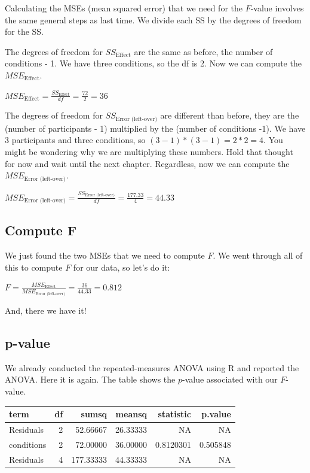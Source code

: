 \documentclass[
]{book}
\begin{document}
Calculating the MSEs (mean squared error) that we need for the \(F\)-value involves the same general steps as last time. We divide each SS by the degrees of freedom for the SS.

The degrees of freedom for \(SS_\text{Effect}\) are the same as before, the number of conditions - 1. We have three conditions, so the df is 2. Now we can compute the \(MSE_\text{Effect}\).

\(MSE_\text{Effect} = \frac{SS_\text{Effect}}{df} = \frac{72}{2} = 36\)

The degrees of freedom for \(SS_\text{Error (left-over)}\) are different than before, they are the (number of participants - 1) multiplied by the (number of conditions -1). We have 3 participants and three conditions, so \((3-1) * (3-1) = 2*2 =4\). You might be wondering why we are multiplying these numbers. Hold that thought for now and wait until the next chapter. Regardless, now we can compute the \(MSE_\text{Error (left-over)}\).

\(MSE_\text{Error (left-over)} = \frac{SS_\text{Error (left-over)}}{df} = \frac{177.33}{4}= 44.33\)

\subsection{Compute F}\label{compute-f}

We just found the two MSEs that we need to compute \(F\). We went through all of this to compute \(F\) for our data, so let's do it:

\(F = \frac{MSE_\text{Effect}}{MSE_\text{Error (left-over)}} = \frac{36}{44.33}= 0.812\)

And, there we have it!

\subsection{p-value}\label{p-value}

We already conducted the repeated-measures ANOVA using R and reported the ANOVA. Here it is again. The table shows the \(p\)-value associated with our \(F\)-value.

\begin{tabular}[t]{l|r|r|r|r|r}
\hline
term & df & sumsq & meansq & statistic & p.value\\
\hline
Residuals & 2 & 52.66667 & 26.33333 & NA & NA\\
\hline
conditions & 2 & 72.00000 & 36.00000 & 0.8120301 & 0.505848\\
\hline
Residuals & 4 & 177.33333 & 44.33333 & NA & NA\\
\hline
\end{tabular}
\end{document}
